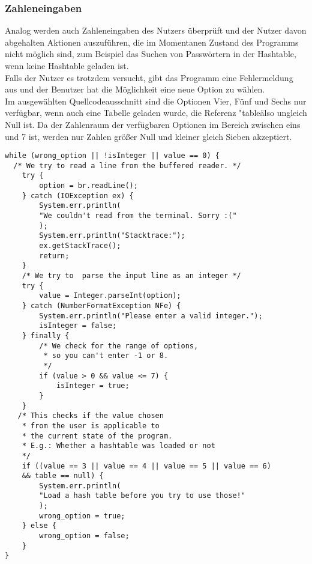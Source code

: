 \documentclass[11pt]{article}
\begin{document}
  \subsubsection{Zahleneingaben}
Analog werden auch Zahleneingaben des Nutzers überprüft und der Nutzer davon abgehalten Aktionen auszuführen, die im Momentanen Zustand des Programms nicht möglich sind, zum Beispiel das Suchen von Passwörtern in der Hashtable, wenn keine Hashtable geladen ist.\\
 Falls der Nutzer es trotzdem versucht, gibt das Programm eine Fehlermeldung aus und der Benutzer hat die Möglichkeit eine neue Option zu wählen.\\
Im ausgewählten Quellcodeausschnitt sind die Optionen Vier, Fünf und Sechs nur verfügbar, wenn auch eine Tabelle
geladen wurde, die Referenz "table\" also ungleich Null ist. Da der Zahlenraum der verfügbaren Optionen im Bereich zwischen eins und 7 ist, werden nur Zahlen größer Null und kleiner gleich Sieben akzeptiert.\\
\begin{lstlisting}[caption=Überprüfung von Zahlen label=lst:checkIntegers, basicstyle=\tiny]
while (wrong_option || !isInteger || value == 0) {
  /* We try to read a line from the buffered reader. */
	try {
		option = br.readLine();
	} catch (IOException ex) {
		System.err.println(
		"We couldn't read from the terminal. Sorry :("
		);
		System.err.println("Stacktrace:");
		ex.getStackTrace();
		return;
	}
    /* We try to  parse the input line as an integer */
    try {
    	value = Integer.parseInt(option);
    } catch (NumberFormatException NFe) {
    	System.err.println("Please enter a valid integer.");
        isInteger = false;
    } finally {
		/* We check for the range of options, 
		 * so you can't enter -1 or 8. 
		 */
		if (value > 0 && value <= 7) {
			isInteger = true;
    	}
   	}
   /* This checks if the value chosen 
    * from the user is applicable to 
    * the current state of the program.
    * E.g.: Whether a hashtable was loaded or not 
    */
    if ((value == 3 || value == 4 || value == 5 || value == 6) 
    && table == null) {
    	System.err.println(
    	"Load a hash table before you try to use those!"
    	);
    	wrong_option = true;
	} else {
    	wrong_option = false;
    }
}
  \end{lstlisting}
\end{document}
